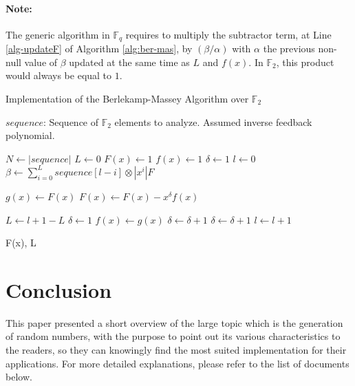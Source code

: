 \documentclass{llncs}
\begin{document}
\paragraph{Note:} The generic algorithm in $\mathbb{F}_q$ requires to multiply the subtractor term, at Line \ref{alg-updateF} of Algorithm \ref{alg:ber-mas}, by $(\beta/\alpha)$ with $\alpha$ the previous non-null value of $\beta$ updated at the same time as $L$ and $f(x)$. In $\mathbb{F}_2$, this product would always be equal to $1$.


\begin{algorithm}[ht]
  \caption{Implementation of the Berlekamp-Massey Algorithm over $\mathbb{F}_2$}\label{alg:ber-mas}
  \begin{algorithmic}[1]
    \Require
      \Statex $sequence$: Sequence of $\mathbb{F}_2$ elements to analyze.
    \Ensure
      \Statex Assumed inverse feedback polynomial.
    \Statex
    \Statex
    
    
    \State $N \gets |sequence|$ 
    \State $L \gets 0$ 
    \State $F(x) \gets 1$ 
    \State $f(x) \gets 1$ 
    \State $\delta \gets 1$ 
    \State $l \gets 0$
        \State $\beta \gets \sum_{i=0}^{L} sequence[l-i] \otimes |x^i|F$ 
        
            \State $g(x) \gets F(x)$ 
            \State $F(x) \gets F(x) - x^\delta f(x)$ \label{alg-updateF}
            
            
           
                \State $L \gets l + 1 - L$
                \State $\delta \gets 1$
                \State $f(x) \gets g(x)$
            \Else
                \State $\delta \gets \delta + 1$
            \EndIf
        \Else
            \State $\delta \gets \delta + 1$
        \EndIf
     	\State $l \gets l + 1$
    \EndFor

    \Return F(x), L
    
  \end{algorithmic}
\end{algorithm}

\section{Conclusion}
\label{sec:conc}

This paper presented a short overview of the large topic which is the generation of random numbers, with the purpose to point out its various characteristics to the readers, so they can knowingly find the most suited implementation for their applications. For more detailed explanations, please refer to the list of documents below.

%
%


\end{document}
